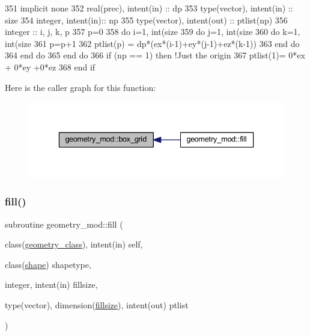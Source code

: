 \begin{DoxyCode}
351     \textcolor{keywordtype}{implicit none}
352     \textcolor{keywordtype}{real(prec)}, \textcolor{keywordtype}{intent(in)} :: dp
353     \textcolor{keywordtype}{type}(vector), \textcolor{keywordtype}{intent(in)} :: size
354     \textcolor{keywordtype}{integer}, \textcolor{keywordtype}{intent(in)}::  np
355     \textcolor{keywordtype}{type}(vector), \textcolor{keywordtype}{intent(out)} :: ptlist(np)
356     \textcolor{keywordtype}{integer} :: i, j, k, p
357     p=0
358     \textcolor{keywordflow}{do} i=1, int(size%
359         \textcolor{keywordflow}{do} j=1, int(size%
360             \textcolor{keywordflow}{do} k=1, int(size%
361                 p=p+1
362                 ptlist(p) = dp*(ex*(i-1)+ey*(j-1)+ez*(k-1))
363 \textcolor{keywordflow}{            end do}
364 \textcolor{keywordflow}{        end do}
365 \textcolor{keywordflow}{    end do}
366     \textcolor{keywordflow}{if} (np == 1) \textcolor{keywordflow}{then} \textcolor{comment}{!Just the origin}
367         ptlist(1)= 0*ex + 0*ey +0*ez
368 \textcolor{keywordflow}{    end if}
\end{DoxyCode}
Here is the caller graph for this function\+:\nopagebreak
\begin{figure}[H]
\begin{center}
\leavevmode
\includegraphics[width=336pt]{namespacegeometry__mod_ae87e4ecff2d21a839da2b82919b5fd0b_icgraph}
\end{center}
\end{figure}
\mbox{\label{namespacegeometry__mod_a095a8b47b3c23e154dcd31ab1441a065}} 
\subsubsection{\texorpdfstring{fill()}{fill()}}
{\footnotesize\ttfamily subroutine geometry\+\_\+mod\+::fill (\begin{DoxyParamCaption}\item[{class(\mbox{\hyperlink{structgeometry__mod_1_1geometry__class}{geometry\+\_\+class}}), intent(in)}]{self,  }\item[{class(\mbox{\hyperlink{structgeometry__mod_1_1shape}{shape}})}]{shapetype,  }\item[{integer, intent(in)}]{fillsize,  }\item[{type(vector), dimension(\mbox{\hyperlink{namespacegeometry__mod_a92602e1198d3607613ea2722fb002685}{fillsize}}), intent(out)}]{ptlist }\end{DoxyParamCaption})\hspace{0.3cm}{\ttfamily [private]}}



